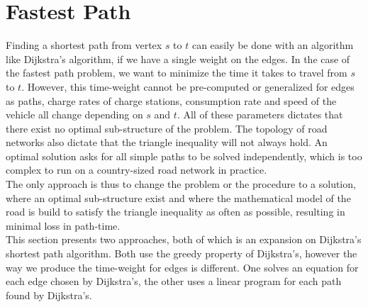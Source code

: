 \section{Fastest Path}
Finding a shortest path from vertex $s$ to $t$ can easily be done with an algorithm like Dijkstra's algorithm, if we have a single weight on the edges. In the case of the fastest path problem, we want to minimize the time it takes to travel from $s$ to $t$. However, this time-weight cannot be pre-computed or generalized for edges as paths, charge rates of charge stations, consumption rate and speed of the vehicle all change depending on $s$ and $t$. All of these parameters dictates that there exist no optimal sub-structure of the problem. The topology of road networks also dictate that the triangle inequality will not always hold. An optimal solution asks for all simple paths to be solved independently, which is too complex to run on a country-sized road network in practice.\\
The only approach is thus to change the problem or the procedure to a solution, where an optimal sub-structure exist and where the mathematical model of the road is build to satisfy the triangle inequality as often as possible, resulting in minimal loss in path-time.\\

This section presents two approaches, both of which is an expansion on Dijkstra's shortest path algorithm. Both use the greedy property of Dijkstra's, however the way we produce the time-weight for edges is different. One solves an equation for each edge chosen by Dijkstra's, the other uses a linear program for each path found by Dijkstra's.
